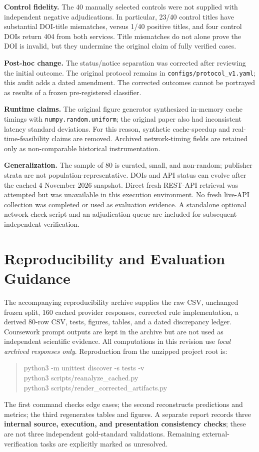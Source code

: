 \documentclass[10pt,a4paper,twocolumn]{article}
\begin{document}
\textbf{Control fidelity.} The 40 manually selected controls were not supplied with independent negative adjudications. In particular, 23/40 control titles have substantial DOI-title mismatches, versus 1/40 positive titles, and four control DOIs return 404 from both services. Title mismatches do not alone prove the DOI is invalid, but they undermine the original claim of fully verified cases.

\textbf{Post-hoc change.} The status/notice separation was corrected after reviewing the initial outcome. The original protocol remains in \texttt{configs/protocol\_v1.yaml}; this audit adds a dated amendment. The corrected outcomes cannot be portrayed as results of a frozen pre-registered classifier.

\textbf{Runtime claims.} The original figure generator synthesized in-memory cache timings with \texttt{numpy.random.uniform}; the original paper also had inconsistent latency standard deviations. For this reason, synthetic cache-speedup and real-time-feasibility claims are removed. Archived network-timing fields are retained only as non-comparable historical instrumentation.

\textbf{Generalization.} The sample of 80 is curated, small, and non-random; publisher strata are not population-representative. DOIs and API status can evolve after the cached 4 November 2026 snapshot. Direct fresh REST-API retrieval was attempted but was unavailable in this execution environment. No fresh live-API collection was completed or used as evaluation evidence. A standalone optional network check script and an adjudication queue are included for subsequent independent verification.

\section{Reproducibility and Evaluation Guidance}
The accompanying reproducibility archive supplies the raw CSV, unchanged frozen split, 160 cached provider responses, corrected rule implementation, a derived 80-row CSV, tests, figures, tables, and a dated discrepancy ledger. Coursework prompt outputs are kept in the archive but are not used as independent scientific evidence. All computations in this revision use \emph{local archived responses only}. Reproduction from the unzipped project root is:
\begin{quote}\footnotesize\ttfamily
python3 -m unittest discover -s tests -v\\
python3 scripts/reanalyze\_cached.py\\
python3 scripts/render\_corrected\_artifacts.py
\end{quote}
The first command checks edge cases; the second reconstructs predictions and metrics; the third regenerates tables and figures. A separate report records three \textbf{internal source, execution, and presentation consistency checks}; these are not three independent gold-standard validations. Remaining external-verification tasks are explicitly marked as unresolved.
\end{document}
